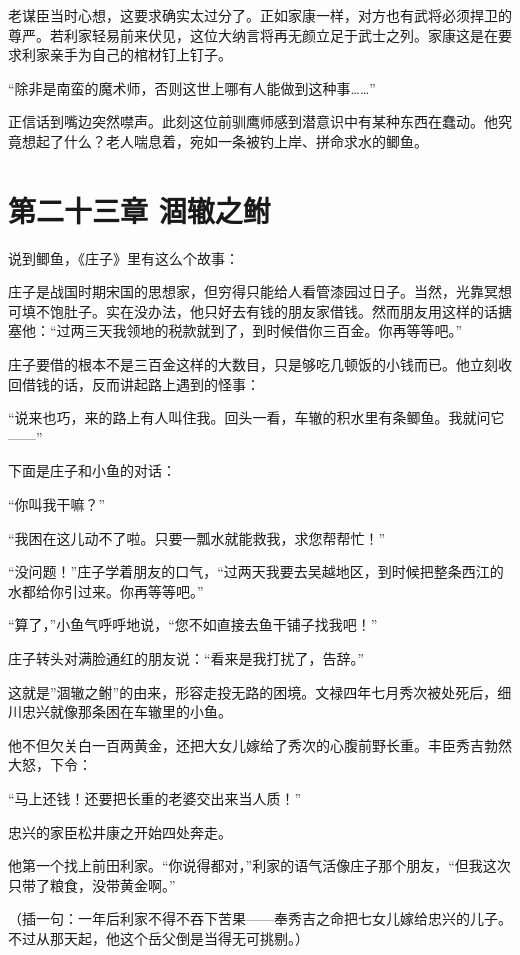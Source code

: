 \documentclass[
]{book}
\begin{document}
老谋臣当时心想，这要求确实太过分了。正如家康一样，对方也有武将必须捍卫的尊严。若利家轻易前来伏见，这位大纳言将再无颜立足于武士之列。家康这是在要求利家亲手为自己的棺材钉上钉子。

``除非是南蛮的魔术师，否则这世上哪有人能做到这种事\ldots\ldots{}''

正信话到嘴边突然噤声。此刻这位前驯鹰师感到潜意识中有某种东西在蠢动。他究竟想起了什么？老人喘息着，宛如一条被钓上岸、拼命求水的鲫鱼。

\chapter*{第二十三章 涸辙之鲋}\label{ux7b2cux4e8cux5341ux4e09ux7ae0-ux6db8ux8f99ux4e4bux9c8b}

说到鲫鱼，《庄子》里有这么个故事：

庄子是战国时期宋国的思想家，但穷得只能给人看管漆园过日子。当然，光靠冥想可填不饱肚子。实在没办法，他只好去有钱的朋友家借钱。然而朋友用这样的话搪塞他：``过两三天我领地的税款就到了，到时候借你三百金。你再等等吧。''

庄子要借的根本不是三百金这样的大数目，只是够吃几顿饭的小钱而已。他立刻收回借钱的话，反而讲起路上遇到的怪事：

``说来也巧，来的路上有人叫住我。回头一看，车辙的积水里有条鲫鱼。我就问它------''

下面是庄子和小鱼的对话：

``你叫我干嘛？''

``我困在这儿动不了啦。只要一瓢水就能救我，求您帮帮忙！''

``没问题！''庄子学着朋友的口气，``过两天我要去吴越地区，到时候把整条西江的水都给你引过来。你再等等吧。''

``算了，''小鱼气呼呼地说，``您不如直接去鱼干铺子找我吧！''

庄子转头对满脸通红的朋友说：``看来是我打扰了，告辞。''

这就是''涸辙之鲋''的由来，形容走投无路的困境。文禄四年七月秀次被处死后，细川忠兴就像那条困在车辙里的小鱼。

他不但欠关白一百两黄金，还把大女儿嫁给了秀次的心腹前野长重。丰臣秀吉勃然大怒，下令：

``马上还钱！还要把长重的老婆交出来当人质！''

忠兴的家臣松井康之开始四处奔走。

他第一个找上前田利家。``你说得都对，''利家的语气活像庄子那个朋友，``但我这次只带了粮食，没带黄金啊。''

（插一句：一年后利家不得不吞下苦果------奉秀吉之命把七女儿嫁给忠兴的儿子。不过从那天起，他这个岳父倒是当得无可挑剔。）
\end{document}
